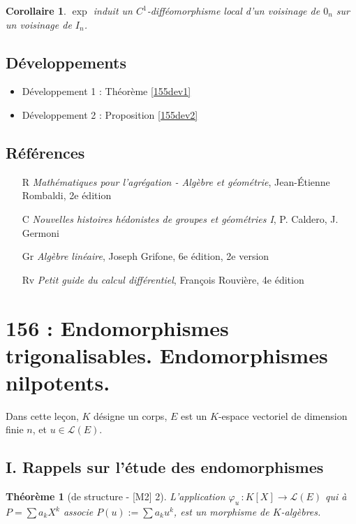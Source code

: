 \documentclass[10pt, a4paper, parskip=full, twoside, twocolumn]{report}
\newtheorem{theorem}[definition]{Théorème}
\newtheorem{corollary}[definition]{Corollaire}
\begin{document}
\begin{corollary}
	$\exp$ induit un $C^1$-difféomorphisme local d'un voisinage de $0_n$ sur un voisinage de $I_n$.
\end{corollary}

\section*{Développements}
\begin{itemize}
	\item Développement 1 : Théorème \ref{155dev1}
	\item Développement 2 : Proposition \ref{155dev2}
\end{itemize}

\section*{Références}
\begin{itemize}
	\item[R] \emph{Mathématiques pour l'agrégation - Algèbre et géométrie}, Jean-Étienne Rombaldi, 2e édition
	\item[C] \emph{Nouvelles histoires hédonistes de groupes et géométries I}, P. Caldero, J. Germoni
	\item[Gr] \emph{Algèbre linéaire}, Joseph Grifone, 6e édition, 2e version
	\item[Rv] \emph{Petit guide du calcul différentiel}, François Rouvière, 4e édition
\end{itemize}


\chapter*{156 : Endomorphismes trigonalisables. Endomorphismes nilpotents.}
\setcounter{definition}{0}
\textcolor{paragraphtext}{Dans cette leçon, $K$ désigne un corps, $E$ est un $K$-espace vectoriel de dimension finie $n$, et $u\in\mathcal{L}(E)$.}

\section*{I. Rappels sur l'étude des endomorphismes}

\begin{theorem}[de structure - \textnormal{[M2] 2}]
	L'application $\varphi_u\,\colon K[X]\to \mathcal{L}(E)$ qui à 
	$P = \sum a_kX^k$ associe $P(u) := \sum a_k u^k$, est un morphisme de $K$-algèbres.
\end{theorem}
\end{document}

